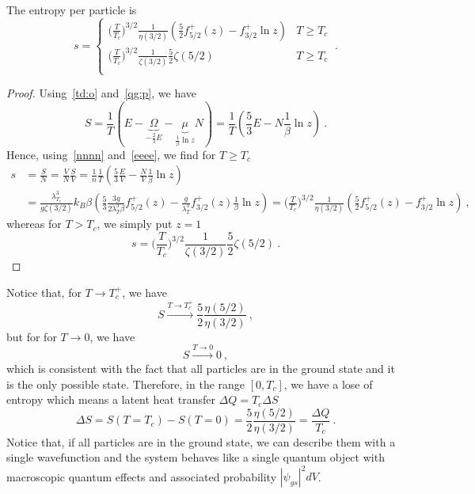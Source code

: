     The entropy per particle is 
    \begin{equation*}
        s = \begin{cases}
            \Big ( \frac{T}{T_c} \Big)^{3/2} \frac{1}{\eta(3/2)} (\frac{5}{2} f^+_{5/2} (z) - f^+_{3/2} \ln z) & T \geq T_c \\
            \Big ( \frac{T}{T_c} \Big)^{3/2} \frac{1}{\zeta (3/2)} \frac{5}{2} \zeta(5/2)  & T \geq T_c \\
        \end{cases} ~.
    \end{equation*}
    \begin{proof}
        Using~\eqref{td:o} and~\eqref{qg:p}, we have 
        \begin{equation*}
            S = \frac{1}{T} (E - \underbrace{\Omega}_{- \frac{2}{3}E} - \underbrace{\mu}_{\frac{1}{\beta} \ln z} N) = \frac{1}{T} (\frac{5}{3} E - N \frac{1}{\beta} \ln z)  ~.
        \end{equation*}
        Hence, using~\eqref{nnnn} and~\eqref{eeee}, we find for $T \geq T_c$
        \begin{equation*}
        \begin{aligned}
            s & = \frac{S}{N} = \frac{V}{N} \frac{S}{V} = \frac{1}{n} \frac{1}{T} (\frac{5}{3} \frac{E}{V} - \frac{N}{V} \frac{1}{\beta} \ln z) \\ & = \frac{\lambda_{T_c}^3}{g \zeta(3/2)} k_B \beta ( \frac{5}{3} \frac{3g}{2 \lambda_T^3 \beta} f^+_{5/2} (z) - \frac{g}{\lambda_T^3} f^+_{3/2} (z) \frac{1}{\beta} \ln z) = \Big ( \frac{T}{T_c} \Big)^{3/2} \frac{1}{\eta(3/2)} (\frac{5}{2} f^+_{5/2} (z) - f^+_{3/2} \ln z) ~,
        \end{aligned}
        \end{equation*}
        whereas for $T > T_c$, we simply put $z = 1$ 
        \begin{equation*}
            s = \Big ( \frac{T}{T_c} \Big)^{3/2} \frac{1}{\zeta (3/2)} \frac{5}{2} \zeta(5/2) ~.
        \end{equation*}
    \end{proof}
    Notice that, for $T \rightarrow T_c^+$, we have 
    \begin{equation*}
        S \xrightarrow{T \rightarrow T_c^+} \frac{5}{2} \frac{\eta(5/2)}{\eta(3/2)} ~,
    \end{equation*}
    but for for $T \rightarrow 0$, we have 
    \begin{equation*}
        S \xrightarrow{T \rightarrow 0} 0 ~,
    \end{equation*} 
    which is consistent with the fact that all particles are in the ground state and it is the only possible state. Therefore, in the range $[0, T_c]$, we have a lose of entropy which means a latent heat transfer $\Delta Q = T_c \Delta S$
    \begin{equation*}
        \Delta S = S(T=T_c) - S(T=0) = \frac{5}{2} \frac{\eta(5/2)}{\eta(3/2)} = \frac{\Delta Q}{T_c} ~.
    \end{equation*}
    Notice that, if all particles are in the ground state, we can describe them with a single wavefunction and the system behaves like a single quantum object with macroscopic quantum effects and associated probability $|\psi_{gs}|^2 dV$. 


